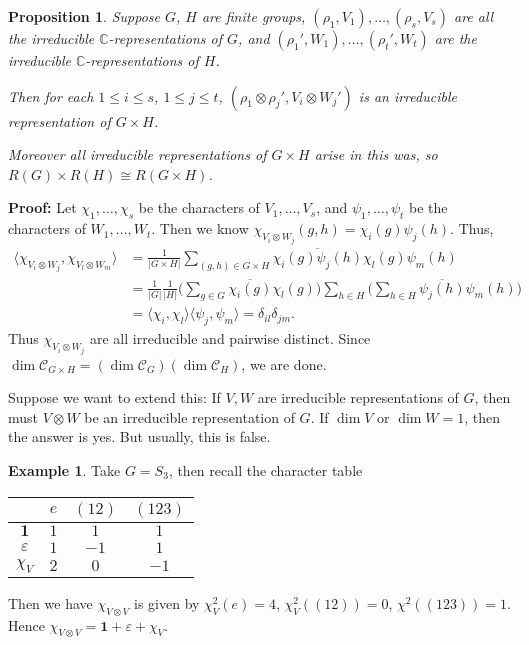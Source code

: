 \documentclass[12pt]{article}
\newtheorem{proposition}{Proposition}[section]
\theoremstyle{definition}
\newtheorem{example}{Example}[section]
\theoremstyle{remark}
\begin{document}
\begin{proposition}
	Suppose $G$, $H$ are finite groups, $(\rho_1, V_1), \ldots, (\rho_s, V_s)$ are all the irreducible $\mathbb{C}$-representations of $G$, and $(\rho_1', W_1), \ldots, (\rho_t', W_t)$ are the irreducible $\mathbb{C}$-representations of $H$.

	Then for each $1 \leq i \leq s$, $1 \leq j \leq t$, $(\rho_1 \otimes \rho_j', V_i \otimes W_j')$ is an irreducible representation of $G \times H$.

	Moreover all irreducible representations of $G \times H$ arise in this was, so $R(G) \times R(H) \cong R(G \times H)$.
\end{proposition}

\begin{adjustbox}{minipage = \columnwidth - 25.5pt, margin=1em, frame=1pt, margin=0em}
	\textbf{Proof:} Let $\chi_1, \ldots, \chi_s$ be the characters of $V_1, \ldots, V_s$, and $\psi_1, \ldots, \psi_t$ be the characters of $W_1, \ldots, W_t$. Then we know $\chi_{V_i \otimes W_j}(g, h) = \chi_i(g) \psi_j(h)$. Thus,
	\begin{align*}
		\langle \chi_{V_i \otimes W_j}, \chi_{V_l \otimes W_m} \rangle &= \frac{1}{|G \times H|} \sum_{(g, h) \in G \times H} \overline{\chi_i(g) \psi_j(h)}\chi_l(g) \psi_m(h) \\
									       &= \frac{1}{|G|}\frac{1}{|H|} \Biggl( \sum_{g \in G} \overline{\chi_i(g)}\chi_l(g) \Biggr)  \sum_{h \in H} \Biggl( \sum_{h \in H} \overline{\psi_j(h)}\psi_m(h) \Biggr) \\
									       &= \langle \chi_i, \chi_l \rangle \langle \psi_j, \psi_m \rangle = \delta_{il} \delta_{jm}.
	\end{align*}
	Thus $\chi_{V_i \otimes W_j}$ are all irreducible and pairwise distinct. Since $\dim \mathcal{C}_{G \times H} = (\dim \mathcal{C}_G) (\dim \mathcal{C}_H)$, we are done.
\end{adjustbox}

Suppose we want to extend this: If $V, W$ are irreducible representations of $G$, then must $V \otimes W$ be an irreducible representation of $G$. If $\dim V$ or $\dim W = 1$, then the answer is yes. But usually, this is false.

\begin{adjustbox}{minipage = \columnwidth - 25.5pt, margin=1em, frame=1pt, margin=0em}
\begin{example}
	Take $G = S_3$, then recall the character table
\begin{center}
\begin{tabular}{c|ccc}
		& $e$ & $(12)$ & $(123)$ \\
			  \hline
	$\mathbf{1}$ & $1$ & $1$ & $1$ \\
	$\varepsilon$ & $1$ & $-1$ & $1$ \\
	$\chi_{V}$ & $2$ & $0$ & $-1$ \\
\end{tabular}
\end{center}
Then we have $\chi_{V \otimes V}$ is given by $\chi_V^2(e) = 4$, $\chi_V^2((12)) = 0$, $\chi^2((123)) = 1$. Hence $\chi_{V \otimes V} = \mathbf{1} + \varepsilon + \chi_{V}$.
\end{example}
\end{adjustbox}
\end{document}
